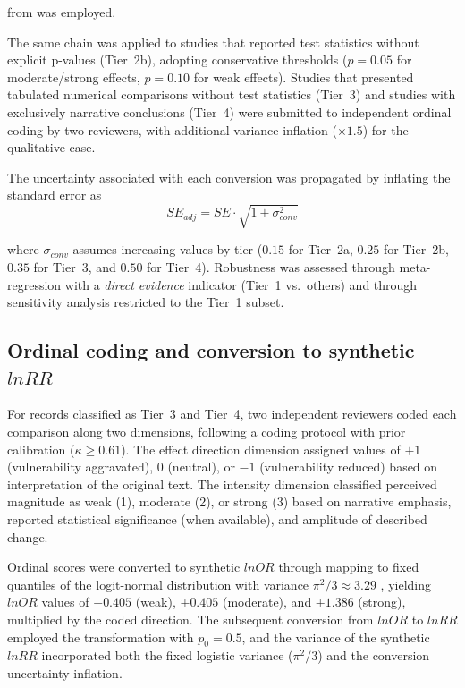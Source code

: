 \documentclass[12pt,a4paper]{article}
\begin{document}
\noindent from \citet{Lajeunesse2011} was employed.

The same chain was applied to studies that reported test statistics without explicit p-values (Tier~2b), adopting conservative thresholds ($p = 0.05$ for moderate/strong effects, $p = 0.10$ for weak effects). Studies that presented tabulated numerical comparisons without test statistics (Tier~3) and studies with exclusively narrative conclusions (Tier~4) were submitted to independent ordinal coding by two reviewers, with additional variance inflation ($\times 1.5$) for the qualitative case.

The uncertainty associated with each conversion was propagated by inflating the standard error as
%
\begin{equation}
SE_{adj} = SE \cdot \sqrt{1 + \sigma^2_{conv}}
\label{eq:se-adj}
\end{equation}

\noindent where $\sigma_{conv}$ assumes increasing values by tier ($0.15$ for Tier~2a, $0.25$ for Tier~2b, $0.35$ for Tier~3, and $0.50$ for Tier~4). Robustness was assessed through meta-regression with a \textit{direct evidence} indicator (Tier~1 vs.\ others) and through sensitivity analysis restricted to the Tier~1 subset.

\subsection{Ordinal coding and conversion to synthetic $lnRR$}
\label{sec:coding}

For records classified as Tier~3 and Tier~4, two independent reviewers coded each comparison along two dimensions, following a coding protocol with prior calibration ($\kappa \geq 0.61$). The effect direction dimension assigned values of $+1$ (vulnerability aggravated), $0$ (neutral), or $-1$ (vulnerability reduced) based on interpretation of the original text. The intensity dimension classified perceived magnitude as weak (1), moderate (2), or strong (3) based on narrative emphasis, reported statistical significance (when available), and amplitude of described change.

Ordinal scores were converted to synthetic $lnOR$ through mapping to fixed quantiles of the logit-normal distribution with variance $\pi^2/3 \approx 3.29$ \citep{Hasselblad1995}, yielding $lnOR$ values of $-0.405$ (weak), $+0.405$ (moderate), and $+1.386$ (strong), multiplied by the coded direction. The subsequent conversion from $lnOR$ to $lnRR$ employed the \citet{Zhang1998} transformation with $p_0 = 0.5$, and the variance of the synthetic $lnRR$ incorporated both the fixed logistic variance ($\pi^2/3$) and the conversion uncertainty inflation.
\end{document}
